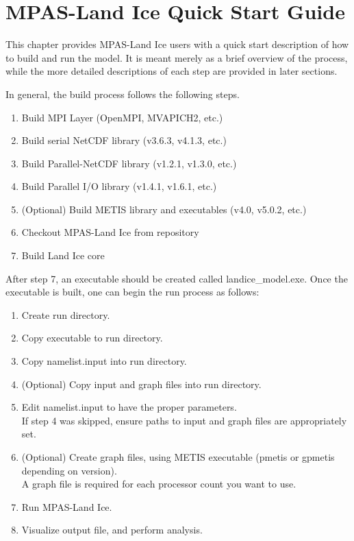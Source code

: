 \chapter{MPAS-Land Ice Quick Start Guide}
\label{chap:quick_start}

This chapter provides MPAS-Land Ice users with a quick start description of how to
build and run the model. It is meant merely as a brief overview of the process,
while the more detailed descriptions of each step are provided in later
sections.

In general, the build process follows the following steps.

\begin{enumerate}
	\item Build MPI Layer (OpenMPI, MVAPICH2, etc.)
	\item Build serial NetCDF library (v3.6.3, v4.1.3, etc.)
	\item Build Parallel-NetCDF library (v1.2.1, v1.3.0, etc.)
	\item Build Parallel I/O library (v1.4.1, v1.6.1, etc.)
	\item (Optional) Build METIS library and executables (v4.0, v5.0.2, etc.)
	\item Checkout MPAS-Land Ice from repository
	\item Build Land Ice core
\end{enumerate}

After step 7, an executable should be created called landice\_model.exe. Once the executable is built, one can begin the run process as follows:

\begin{enumerate}
	\item Create run directory.
	\item Copy executable to run directory.
	\item Copy namelist.input into run directory.
	\item (Optional) Copy input and graph files into run directory.
	\item Edit namelist.input to have the proper parameters. \\
		  If step 4 was skipped, ensure paths to input and graph files are appropriately set.
	\item (Optional) Create graph files, using METIS executable (pmetis or gpmetis depending on version). \\
		  A graph file is required for each processor count you want to use.
	\item Run MPAS-Land Ice.
	\item Visualize output file, and perform analysis.
\end{enumerate}
